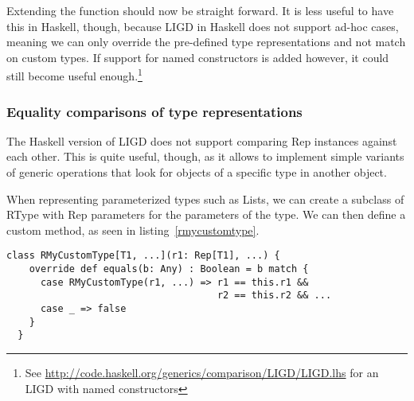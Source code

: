 Extending the function should now be straight forward. It is less useful to
have this in Haskell, though, because LIGD in Haskell does not support ad-hoc
cases, meaning we can only override the pre-defined type representations and not
match on custom types. If support for named constructors is added however, it
could still become useful enough.\footnote{See \url{http://code.haskell.org/generics/comparison/LIGD/LIGD.lhs} for an LIGD with named constructors}

\subsubsection{Equality comparisons of type representations}
The Haskell version of LIGD does not support comparing Rep instances
against each other. This is quite useful, though, as it allows to
implement simple variants of generic operations that look for objects
of a specific type in another object.


When representing parameterized types such as Lists, we can create a subclass
of RType with Rep parameters for the parameters of the type. We can then
define a custom  method, as seen in listing~\ref{rmycustomtype}.

\begin{lstlisting}[float,caption=Representing custom parameterized types,label=rmycustomtype]
  class RMyCustomType[T1, ...](r1: Rep[T1], ...) {
    override def equals(b: Any) : Boolean = b match {
      case RMyCustomType(r1, ...) => r1 == this.r1 &&
                                     r2 == this.r2 && ...
      case _ => false
    }
  }
\end{lstlisting}
